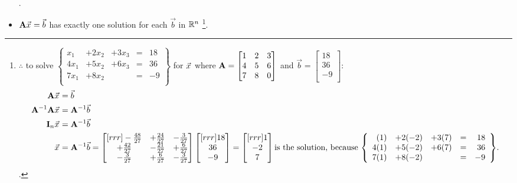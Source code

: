 \documentclass{article}%
\begin{document}
\begin{multicols}{2}
\begin{itemize}
{\begin{align}
\end{align}}.
  \item $\matA\vecx = \vec{b}$ has exactly one solution for each $\vec{b}$ in $\mathbb{R}^{n}$ \footnote{$\therefore$ to solve 
$\left\{ \begin{array}{rrrlr} x_1 &+2x_2 &+3x_3 &=& 18 \\ 4x_1 &+5x_2 &+6x_3 &=& 36 \\ 7x_1 &+8x_2 &&=& -9 \\ \end{array} \right\}$ for $\vecx$ where $\mathbf{A} = \begin{bmatrix} 1& 2& 3\\ 4& 5& 6\\ 7& 8& 0\\ \end{bmatrix}$ and $\vec{b} = \begin{bmatrix} 18 \\ 36 \\ -9 \\ \end{bmatrix}$:
\begin{align} \matA\vecx &= \vec{b} \\
\matA^{-1}\matA\vecx &= \matA^{-1}\vec{b} \\
\matI_{n}\vecx &= \matA^{-1}\vec{b} \\
\vecx &= \matA^{-1} \vec{b} = 
\begin{bmatrix}[rrr]
-\frac{48}{27}& +\frac{24}{27}& -\frac{3}{27}\\ +\frac{42}{27}& -\frac{21}{27}& +\frac{6}{27}\\ -\frac{3}{27}& +\frac{6}{27}& -\frac{3}{27}\\
\end{bmatrix} \begin{bmatrix}[rrr] 18\\36\\-9 \\ \end{bmatrix} = \begin{bmatrix}[rrr] 1 \\ -2 \\ 7 \\ \end{bmatrix} \text{is the solution, because $\left\{ \begin{array}{rrrlr} (1) &+2(-2) &+3(7) &=& 18 \\ 4(1) &+5(-2) &+6(7) &=& 36 \\ 7(1) &+8(-2) &&=& -9 \\ \end{array} \right\}$}.
\end{align}.}.
\end{itemize}


\end{multicols}
\end{document}
